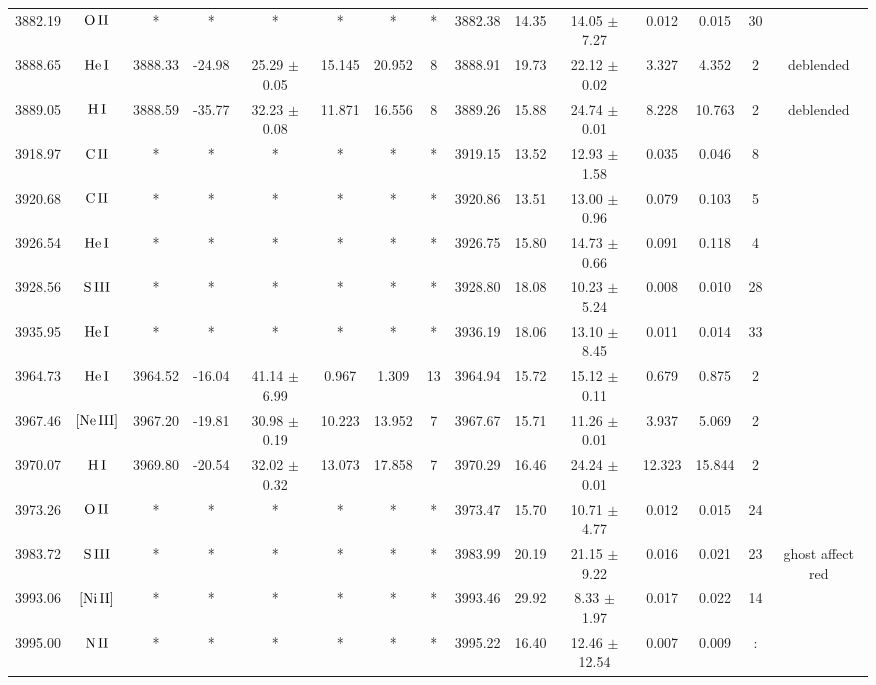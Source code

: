 \documentclass{article}
\begin{document}
\begin{table*}
\begin{adjustbox}{width=\textwidth}
\begin{tabular}{ccccccccccccccc}
3882.19 & $\mbox{O}\thinspace \mbox{II}$ & * & * & * & * & * & * & 3882.38 & 14.35 & 14.05 $\pm$ 7.27 & 0.012 & 0.015 & 30 &  \\
3888.65 & $\mbox{He}\thinspace \mbox{I}$ & 3888.33 & -24.98 & 25.29 $\pm$ 0.05 & 15.145 & 20.952 & 8 & 3888.91 & 19.73 & 22.12 $\pm$ 0.02 & 3.327 & 4.352 & 2 &  deblended \\
3889.05 & $\mbox{H}\thinspace \mbox{I}$ & 3888.59 & -35.77 & 32.23 $\pm$ 0.08 & 11.871 & 16.556 & 8 & 3889.26 & 15.88 & 24.74 $\pm$ 0.01 & 8.228 & 10.763 & 2 &  deblended \\
3918.97 & $\mbox{C}\thinspace \mbox{II}$ & * & * & * & * & * & * & 3919.15 & 13.52 & 12.93 $\pm$ 1.58 & 0.035 & 0.046 & 8 &  \\
3920.68 & $\mbox{C}\thinspace \mbox{II}$ & * & * & * & * & * & * & 3920.86 & 13.51 & 13.00 $\pm$ 0.96 & 0.079 & 0.103 & 5 &  \\
3926.54 & $\mbox{He}\thinspace \mbox{I}$ & * & * & * & * & * & * & 3926.75 & 15.80 & 14.73 $\pm$ 0.66 & 0.091 & 0.118 & 4 &  \\
3928.56 & $\mbox{S}\thinspace \mbox{III}$ & * & * & * & * & * & * & 3928.80 & 18.08 & 10.23 $\pm$ 5.24 & 0.008 & 0.010 & 28 &  \\
3935.95 & $\mbox{He}\thinspace \mbox{I}$ & * & * & * & * & * & * & 3936.19 & 18.06 & 13.10 $\pm$ 8.45 & 0.011 & 0.014 & 33 &  \\
3964.73 & $\mbox{He}\thinspace \mbox{I}$ & 3964.52 & -16.04 & 41.14 $\pm$ 6.99 & 0.967 & 1.309 & 13 & 3964.94 & 15.72 & 15.12 $\pm$ 0.11 & 0.679 & 0.875 & 2 &  \\
3967.46 & $\mbox{[Ne}\thinspace \mbox{III]}$ & 3967.20 & -19.81 & 30.98 $\pm$ 0.19 & 10.223 & 13.952 & 7 & 3967.67 & 15.71 & 11.26 $\pm$ 0.01 & 3.937 & 5.069 & 2 &  \\
3970.07 & $\mbox{H}\thinspace \mbox{I}$ & 3969.80 & -20.54 & 32.02 $\pm$ 0.32 & 13.073 & 17.858 & 7 & 3970.29 & 16.46 & 24.24 $\pm$ 0.01 & 12.323 & 15.844 & 2 &  \\
3973.26 & $\mbox{O}\thinspace \mbox{II}$ & * & * & * & * & * & * & 3973.47 & 15.70 & 10.71 $\pm$ 4.77 & 0.012 & 0.015 & 24 &  \\
3983.72 & $\mbox{S}\thinspace \mbox{III}$ & * & * & * & * & * & * & 3983.99 & 20.19 & 21.15 $\pm$ 9.22 & 0.016 & 0.021 & 23 &  ghost affect red \\
3993.06 & $\mbox{[Ni}\thinspace \mbox{II]}$ & * & * & * & * & * & * & 3993.46 & 29.92 & 8.33 $\pm$ 1.97 & 0.017 & 0.022 & 14 &  \\
3995.00 & $\mbox{N}\thinspace \mbox{II}$ & * & * & * & * & * & * & 3995.22 & 16.40 & 12.46 $\pm$ 12.54 & 0.007 & 0.009 & : &  \\

\end{tabular}
\end{adjustbox}
\end{table*}
\end{document}

